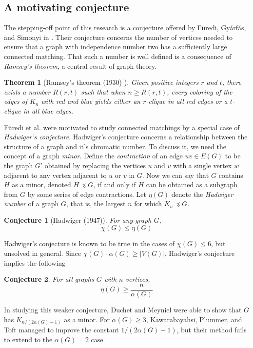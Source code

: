 \documentclass[12pt]{article}
\newtheorem{conj}{Conjecture}
\newtheorem{theorem}{Theorem}
\theoremstyle{definition}
\begin{document}
\subsection{A motivating conjecture}
The stepping-off point of this research is a conjecture offered by F\"{u}redi, Gy{\'a}rf{\'a}s, and Simonyi in \cite{FGS}. Their conjecture concerns the number of vertices needed to ensure that a graph with independence number two has a sufficiently large connected matching.  That such a number is well defined is a consequence of \textit{Ramsey's theorem}, a central result of graph theory.
\begin{theorem}[Ramsey's theorem (1930) ]
	Given positive integers $r$ and $t$, there exists a number $R(r,t)$ such that when $n \geq R(r,t)$, every coloring of the edges of $K_n$ with red and blue yields either an $r$-clique in all red edges or a $t$-clique in all blue edges.    
\end{theorem}
F\"{u}redi et al. were motivated to study connected matchings by a special case of \textit{Hadwiger's conjecture}.  Hadwiger's conjecture concerns a relationship between the structure of a graph and it's chromatic number.  To discuss it, we need the concept of a graph \textit{minor}.  Define the \textit{contraction} of an edge $uv \in E(G)$ to be the graph $G'$ obtained by replacing the vertices $u$ and $v$ with a single vertex $w$ adjacent to any vertex adjacent to $u$ or $v$ in $G$.  Now we can say that $G$ contains $H$ as a minor, denoted $H \preceq G$, if and only if $H$ can be obtained as a subgraph from $G$ by some series of edge contractions.  Let $\eta(G)$ denote the \textit{Hadwiger number} of a graph $G$, that is, the largest $n$ for which $K_n \preceq G$.
\begin{conj}[Hadwiger (1947)]
	For any graph $G$, \[\chi(G) \leq \eta(G)\]\label{HC}
\end{conj}  
\noindent Hadwiger's conjecture is known to be true in the cases of $\chi(G) \leq 6$, but unsolved in general.
Since $\chi(G)\cdot\alpha(G) \geq |V(G)|$, Hadwiger's conjecture implies the following
\begin{conj}
 For all graphs $G$ with $n$ vertices, \[\eta(G) \geq \frac{n}{\alpha(G)}\]
\label{weakHC} 
\end{conj}In studying this weaker conjecture, Duchet and Meyniel \cite{DandM} were able to show that $G$ has $K_{n/(2\alpha(G)-1)}$ as a minor.  For $\alpha(G) \geq 3$, Kawarabayahsi, Plummer, and Toft \cite{DandMimprove} managed to improve the constant $1/(2\alpha(G)-1)$, but their method fails to extend to the $\alpha(G) = 2$ case.  
\end{document}
